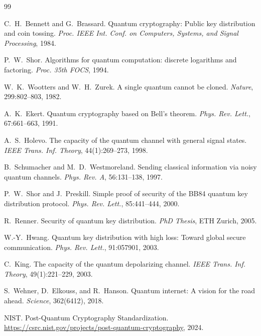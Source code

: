 \documentclass[11pt,a4paper]{article}
\theoremstyle{plain}
\theoremstyle{definition}
\theoremstyle{remark}
\begin{document}
\begin{thebibliography}{99}

C.~H.~Bennett and G.~Brassard.
\newblock Quantum cryptography: Public key distribution and coin tossing.
\newblock \textit{Proc. IEEE Int. Conf. on Computers, Systems, and Signal
Processing}, 1984.

P.~W.~Shor.
\newblock Algorithms for quantum computation: discrete logarithms and factoring.
\newblock \textit{Proc. 35th FOCS}, 1994.

W.~K.~Wootters and W.~H.~Zurek.
\newblock A single quantum cannot be cloned.
\newblock \textit{Nature}, 299:802--803, 1982.

A.~K.~Ekert.
\newblock Quantum cryptography based on Bell's theorem.
\newblock \textit{Phys. Rev. Lett.}, 67:661--663, 1991.

A.~S.~Holevo.
\newblock The capacity of the quantum channel with general signal states.
\newblock \textit{IEEE Trans. Inf. Theory}, 44(1):269--273, 1998.

B.~Schumacher and M.~D.~Westmoreland.
\newblock Sending classical information via noisy quantum channels.
\newblock \textit{Phys. Rev. A}, 56:131--138, 1997.

P.~W.~Shor and J.~Preskill.
\newblock Simple proof of security of the BB84 quantum key distribution protocol.
\newblock \textit{Phys. Rev. Lett.}, 85:441--444, 2000.

R.~Renner.
\newblock Security of quantum key distribution.
\newblock \textit{PhD Thesis}, ETH Zurich, 2005.

W.-Y.~Hwang.
\newblock Quantum key distribution with high loss: Toward global secure
communication.
\newblock \textit{Phys. Rev. Lett.}, 91:057901, 2003.

C.~King.
\newblock The capacity of the quantum depolarizing channel.
\newblock \textit{IEEE Trans. Inf. Theory}, 49(1):221--229, 2003.

S.~Wehner, D.~Elkouss, and R.~Hanson.
\newblock Quantum internet: A vision for the road ahead.
\newblock \textit{Science}, 362(6412), 2018.

NIST.
\newblock Post-Quantum Cryptography Standardization.
\newblock \url{https://csrc.nist.gov/projects/post-quantum-cryptography}, 2024.


\end{thebibliography}
\end{document}
